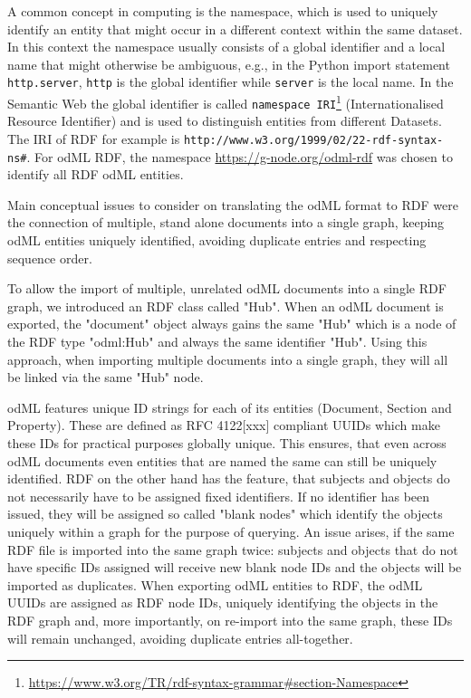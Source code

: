 \documentclass{article}
\begin{document}
A common concept in computing is the namespace, which is used to uniquely identify an entity that might occur in a different context within the same dataset. In this context the namespace usually consists of a global identifier and a local name that might otherwise be ambiguous, e.g., in the Python import statement \texttt{http.server}, \texttt{http} is the global identifier while \texttt{server} is the local name.
In the Semantic Web the global identifier is called \texttt{namespace IRI}\footnote{\url{https://www.w3.org/TR/rdf-syntax-grammar\#section-Namespace}} (Internationalised Resource Identifier) and is used to distinguish entities from different Datasets. The IRI of RDF for example is \texttt{http://www.w3.org/1999/02/22-rdf-syntax-ns\#}. For odML RDF, the namespace \url{https://g-node.org/odml-rdf} was chosen to identify all RDF odML entities.

Main conceptual issues to consider on translating the odML format to RDF were the connection of multiple, stand alone documents into a single graph, keeping odML entities uniquely identified, avoiding duplicate entries and respecting sequence order.

To allow the import of multiple, unrelated odML documents into a single RDF graph, we introduced an RDF class called "Hub". When an odML document is exported, the "document" object always gains the same "Hub" which is a node of the RDF type "odml:Hub" and always the same identifier "Hub". Using this approach, when importing multiple documents into a single graph, they will all be linked via the same "Hub" node.

odML features unique ID strings for each of its entities (Document, Section and Property). These are defined as RFC 4122[xxx] compliant UUIDs which make these IDs for practical purposes globally unique. This ensures, that even across odML documents even entities that are named the same can still be uniquely identified.
RDF on the other hand has the feature, that subjects and objects do not necessarily have to be assigned fixed identifiers. If no identifier has been issued, they will be assigned so called "blank nodes" which identify the objects uniquely within a graph for the purpose of querying. An issue arises, if the same RDF file is imported into the same graph twice: subjects and objects that do not have specific IDs assigned will receive new blank node IDs and the objects will be imported as duplicates.
When exporting odML entities to RDF, the odML UUIDs are assigned as RDF node IDs, uniquely identifying the objects in the RDF graph and, more importantly, on re-import into the same graph, these IDs will remain unchanged, avoiding duplicate entries all-together.
\end{document}

